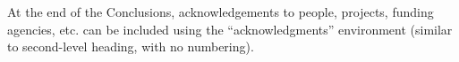 \documentclass{article}
\begin{document}
\begin{acknowledgments}
At the end of the Conclusions, acknowledgements to people, projects, funding agencies, etc. can be included using the ``acknowledgments'' environment (similar to second-level heading, with no numbering).
\end{acknowledgments} 

\balance %


\end{document}
